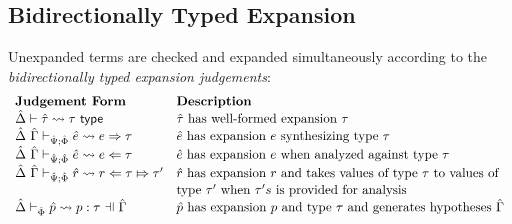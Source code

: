 

\subsection{Bidirectionally Typed Expansion}
Unexpanded terms are checked and expanded simultaneously according to the \emph{bidirectionally typed expansion judgements}:
\[\begin{array}{ll}
\textbf{Judgement Form} & \textbf{Description}\\
\expandsTU{\uDelta}{\utau}{\tau} & \text{$\utau$ has well-formed expansion $\tau$}\\
\esyn{\uDelta}{\uGamma}{\uPsi}{\uPhi}{\ue}{e}{\tau} & \text{$\ue$ has expansion $e$ synthesizing type $\tau$}\\
\eana{\uDelta}{\uGamma}{\uPsi}{\uPhi}{\ue}{e}{\tau} & \text{$\ue$ has expansion $e$ when analyzed against type $\tau$}\\
\rana{\uDelta}{\uGamma}{\uPsi}{\uPhi}{\urv}{r}{\tau}{\tau'} & \text{$\urv$ has expansion $r$ and takes values of type $\tau$ to values of}\\
& \text{type $\tau'$ when $\tau's$ is provided for analysis}\\
\patExpands{\upctx}{\uPhi}{\upv}{p}{\tau} & \text{$\upv$ has expansion $p$ and type $\tau$ and generates hypotheses $\upctx$}
\end{array}\]

